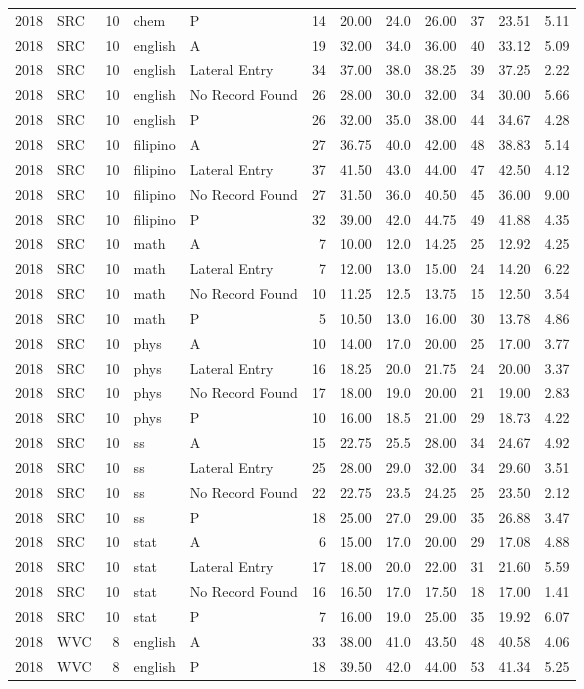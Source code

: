 \documentclass[]{article}
\begin{document}
\begin{longtable}[]{@{}rlrllrrrrrrr@{}}
2018 & SRC & 10 & chem & P & 14 & 20.00 & 24.0 & 26.00 & 37 & 23.51 &
5.11\tabularnewline
2018 & SRC & 10 & english & A & 19 & 32.00 & 34.0 & 36.00 & 40 & 33.12 &
5.09\tabularnewline
2018 & SRC & 10 & english & Lateral Entry & 34 & 37.00 & 38.0 & 38.25 &
39 & 37.25 & 2.22\tabularnewline
2018 & SRC & 10 & english & No Record Found & 26 & 28.00 & 30.0 & 32.00
& 34 & 30.00 & 5.66\tabularnewline
2018 & SRC & 10 & english & P & 26 & 32.00 & 35.0 & 38.00 & 44 & 34.67 &
4.28\tabularnewline
2018 & SRC & 10 & filipino & A & 27 & 36.75 & 40.0 & 42.00 & 48 & 38.83
& 5.14\tabularnewline
2018 & SRC & 10 & filipino & Lateral Entry & 37 & 41.50 & 43.0 & 44.00 &
47 & 42.50 & 4.12\tabularnewline
2018 & SRC & 10 & filipino & No Record Found & 27 & 31.50 & 36.0 & 40.50
& 45 & 36.00 & 9.00\tabularnewline
2018 & SRC & 10 & filipino & P & 32 & 39.00 & 42.0 & 44.75 & 49 & 41.88
& 4.35\tabularnewline
2018 & SRC & 10 & math & A & 7 & 10.00 & 12.0 & 14.25 & 25 & 12.92 &
4.25\tabularnewline
2018 & SRC & 10 & math & Lateral Entry & 7 & 12.00 & 13.0 & 15.00 & 24 &
14.20 & 6.22\tabularnewline
2018 & SRC & 10 & math & No Record Found & 10 & 11.25 & 12.5 & 13.75 &
15 & 12.50 & 3.54\tabularnewline
2018 & SRC & 10 & math & P & 5 & 10.50 & 13.0 & 16.00 & 30 & 13.78 &
4.86\tabularnewline
2018 & SRC & 10 & phys & A & 10 & 14.00 & 17.0 & 20.00 & 25 & 17.00 &
3.77\tabularnewline
2018 & SRC & 10 & phys & Lateral Entry & 16 & 18.25 & 20.0 & 21.75 & 24
& 20.00 & 3.37\tabularnewline
2018 & SRC & 10 & phys & No Record Found & 17 & 18.00 & 19.0 & 20.00 &
21 & 19.00 & 2.83\tabularnewline
2018 & SRC & 10 & phys & P & 10 & 16.00 & 18.5 & 21.00 & 29 & 18.73 &
4.22\tabularnewline
2018 & SRC & 10 & ss & A & 15 & 22.75 & 25.5 & 28.00 & 34 & 24.67 &
4.92\tabularnewline
2018 & SRC & 10 & ss & Lateral Entry & 25 & 28.00 & 29.0 & 32.00 & 34 &
29.60 & 3.51\tabularnewline
2018 & SRC & 10 & ss & No Record Found & 22 & 22.75 & 23.5 & 24.25 & 25
& 23.50 & 2.12\tabularnewline
2018 & SRC & 10 & ss & P & 18 & 25.00 & 27.0 & 29.00 & 35 & 26.88 &
3.47\tabularnewline
2018 & SRC & 10 & stat & A & 6 & 15.00 & 17.0 & 20.00 & 29 & 17.08 &
4.88\tabularnewline
2018 & SRC & 10 & stat & Lateral Entry & 17 & 18.00 & 20.0 & 22.00 & 31
& 21.60 & 5.59\tabularnewline
2018 & SRC & 10 & stat & No Record Found & 16 & 16.50 & 17.0 & 17.50 &
18 & 17.00 & 1.41\tabularnewline
2018 & SRC & 10 & stat & P & 7 & 16.00 & 19.0 & 25.00 & 35 & 19.92 &
6.07\tabularnewline
2018 & WVC & 8 & english & A & 33 & 38.00 & 41.0 & 43.50 & 48 & 40.58 &
4.06\tabularnewline
2018 & WVC & 8 & english & P & 18 & 39.50 & 42.0 & 44.00 & 53 & 41.34 &
5.25\tabularnewline

\end{longtable}
\end{document}

